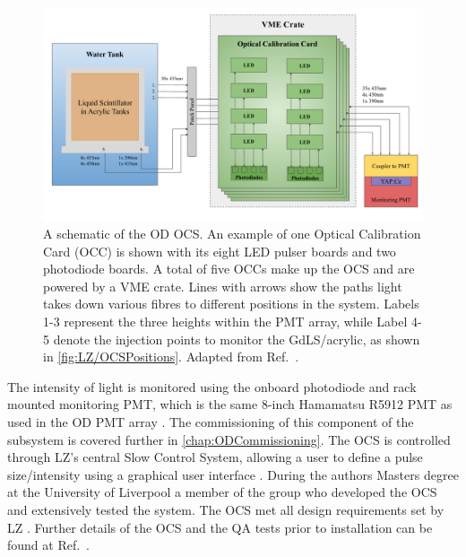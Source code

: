 \begin{figure}[!ht]
    \centering
    \includegraphics[width=\linewidth]{figures/LZ/OCSSchematics.pdf}
    \caption{A schematic of the OD OCS. An example of one Optical Calibration Card (OCC) is shown with its eight LED pulser boards and two photodiode boards. A total of five OCCs make up the OCS and are powered by a VME crate. Lines with arrows show the paths light takes down various fibres to different positions in the system. Labels 1-3 represent the three heights within the PMT array, while Label 4-5 denote the injection points to monitor the GdLS/acrylic, as shown in \autoref{fig:LZ/OCSPositions}. Adapted from Ref.~\cite{Turner:2021qvi,LZ:2024bsz}.}
    \label{fig:LZ/OCSSchematic}
\end{figure}
The intensity of light is monitored using the onboard photodiode and rack mounted monitoring PMT, which is the same 8-inch Hamamatsu R5912 PMT as used in the OD PMT array \cite{Turner:2021qvi}. The commissioning of this component of the subsystem is covered further in \autoref{chap:ODCommissioning}. The OCS is controlled through LZ's central Slow Control System, allowing a user to define a pulse size/intensity using a graphical user interface \cite{hbirch:thesis}.
During the authors Masters degree at the University of Liverpool a member of the group who developed the OCS and extensively tested the system. The OCS met all design requirements set by LZ \cite{Turner:2021qvi}. Further details of the OCS and the QA tests prior to installation can be found at Ref.~\cite{hbirch:thesis,Turner:2021qvi}. 

